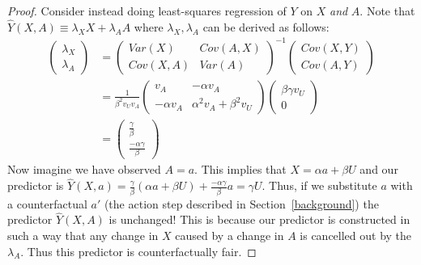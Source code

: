 \begin{proof}
Consider instead doing least-squares regression of $Y$ on $X$ \emph{and} $A$. Note that $\hat Y(X,A) \equiv \lambda_X X + \lambda_A A$ where $\lambda_X,\lambda_A$ can be derived as follows:
\begin{align}
\begin{pmatrix}
\lambda_X \\
\lambda_A
\end{pmatrix} &=
\begin{pmatrix}
Var(X) & Cov(A,X) \\
Cov(X,A) & Var(A)
\end{pmatrix}^{-1}
\begin{pmatrix}
Cov(X,Y) \\
Cov(A,Y)
\end{pmatrix} \nonumber \\
&=
\frac{1}{\beta^2 v_U v_A}
\begin{pmatrix}
v_A & -\alpha v_A \\
-\alpha v_A & \alpha^2 v_A + \beta^2 v_U
\end{pmatrix}
\begin{pmatrix}
\beta \gamma v_U \\
0
\end{pmatrix} \nonumber \\
&=
\begin{pmatrix}
\frac{\gamma}{\beta} \\
\frac{-\alpha\gamma}{\beta}
\end{pmatrix}
\end{align}
Now imagine we have observed $A\!=\!a$. This implies that $X = \alpha a + \beta U$ and our predictor is $\hat Y(X,a) = \frac{\gamma}{\beta}(\alpha a + \beta U) + \frac{-\alpha\gamma}{\beta} a = \gamma U$. Thus, if we substitute $a$ with a counterfactual $a'$ (the action step described in Section~\ref{background}) the predictor $\hat Y(X,A)$ is unchanged! This is because our predictor is constructed in such a way that any change in $X$ caused by a change in $A$ is cancelled out by the $\lambda_A$. Thus this predictor is counterfactually fair.
\end{proof}

